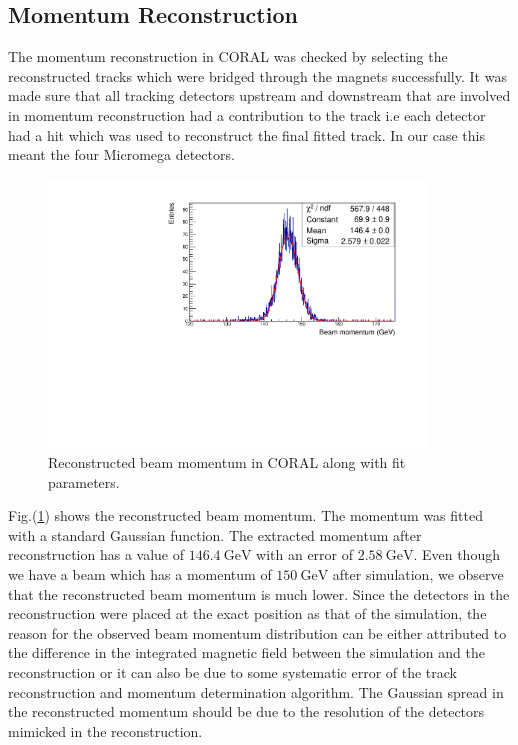 \subsection{Momentum Reconstruction}
\label{subsec:mom_reco}
The momentum reconstruction in CORAL was checked by selecting the reconstructed tracks which were bridged through the magnets successfully. It was made sure that all tracking detectors upstream and downstream that are involved in momentum reconstruction had a contribution to the track i.e each detector had a hit which was used to reconstruct the final fitted track. In our case this meant the four Micromega detectors.
 \begin{figure}[h!]
 \centering
 \includegraphics[width=0.9\textwidth]{thesis_figures/MC_reco/beam_mom_bigger_axis.pdf}
 \caption{Reconstructed beam momentum in CORAL along with fit parameters.}
 \label{fig:reco_beam_mom}
 \end{figure}

Fig.(\ref{fig:reco_beam_mom}) shows the reconstructed beam momentum. The momentum was fitted with a standard Gaussian function. The extracted momentum after reconstruction has a value of $146.4 ~\text{GeV}$ with an error of $2.58 ~\text{GeV}$. Even though we have a beam which has a momentum of $150 ~\text{GeV}$ after simulation, we observe that the reconstructed beam momentum is much lower. Since the detectors in the reconstruction were placed at the exact position as that of the simulation, the reason for the observed beam momentum distribution can be either attributed to the difference in the integrated magnetic field between the simulation and the reconstruction or it can also be due to some systematic error of the track reconstruction and momentum determination algorithm. The Gaussian spread in the reconstructed momentum should be due to the resolution of the detectors mimicked in the reconstruction.

